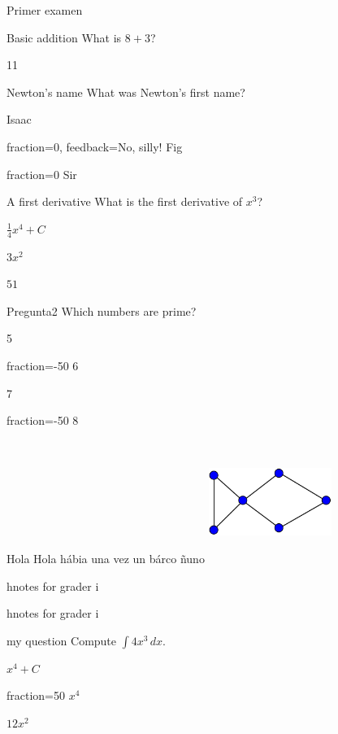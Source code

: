 \documentclass[12pt]{article}
\begin{document}
\begin{quiz}{Primer examen}

\begin{numerical}{Basic addition}
What is $8+3$?
\item 11
\end{numerical}
\begin{shortanswer}[case sensitive=true]{Newton’s name}
What was Newton’s first name?
\item Isaac
\item[fraction=0, feedback={No, silly!}] Fig
\item{fraction=0} Sir
\end{shortanswer}
\begin{multi}{A first derivative}
What is the first derivative of $x^3$?
\item $\frac{1}{4} x^4+C$
\item* $3x^2$
\item $51$
\end{multi}
\begin{multi}[multiple]{Pregunta2}
Which numbers are prime?
\item* 5
\item[fraction=-50] 6
\item* 7
\item[fraction=-50] 8
\end{multi}



\begin{essay}[response format=file,attachments allowed=1]{Hola}
Hola hábia una vez un bárco ñuno
\includegraphics[width=4cm,height=4cm,ppi=100]{imagenes/grafo.png}
\item hnotes for grader i
\item hnotes for grader i
\end{essay}
\begin{multi}{my question}
Compute $\int 4x^3\,dx$.
\item* $x^4+C$
\item[fraction=50] $x^4$
\item $12x^2$
\end{multi}
\end{quiz}
\end{document}
